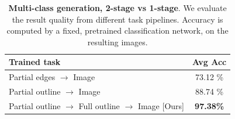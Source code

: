 \begin{table}[t]
    \centering
        \begin{tabular}{l c}
        \toprule
        \textbf{Trained task} & \textbf{Avg Acc} \\ \midrule
        Partial edges $\rightarrow$ Image & 73.12 \% \\
        Partial outline $\rightarrow$ Image & 88.74 \% \\
        Partial outline $\rightarrow$ Full outline $\rightarrow$ Image [Ours] & \textbf{97.38\%}  \\
        \bottomrule %
        \end{tabular}
    \vspace{-2mm}
    \caption{\label{table:2step_eval} \textbf{Multi-class generation, 2-stage vs 1-stage}. We evaluate the result quality from different task pipelines. Accuracy is computed by a fixed, pretrained classification network, on the resulting images.
    \vspace{-1mm}
    }
\end{table}




